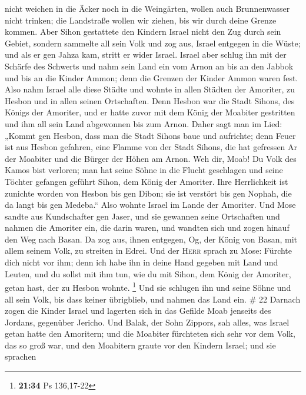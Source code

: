 nicht weichen in die Äcker noch in die Weingärten, wollen auch
Brunnenwasser nicht trinken; die Landstraße wollen wir ziehen, bis wir
durch deine Grenze kommen.  Aber Sihon gestattete den
Kindern Israel nicht den Zug durch sein Gebiet, sondern sammelte all
sein Volk und zog aus, Israel entgegen in die Wüste; und als er gen
Jahza kam, stritt er wider Israel.  Israel aber schlug
ihn mit der Schärfe des Schwerts und nahm sein Land ein vom Arnon an bis
an den Jabbok und bis an die Kinder Ammon; denn die Grenzen der Kinder
Ammon waren fest.  Also nahm Israel alle diese Städte und
wohnte in allen Städten der Amoriter, zu Hesbon und in allen seinen
Ortschaften.  Denn Hesbon war die Stadt Sihons, des
Königs der Amoriter, und er hatte zuvor mit dem König der Moabiter
gestritten und ihm all sein Land abgewonnen bis zum Arnon.
 Daher sagt man im Lied: „Kommt gen Hesbon, dass man die
Stadt Sihons baue und aufrichte;  denn Feuer ist aus
Hesbon gefahren, eine Flamme von der Stadt Sihons, die hat gefressen Ar
der Moabiter und die Bürger der Höhen am Arnon.  Weh dir,
Moab! Du Volk des Kamos bist verloren; man hat seine Söhne in die Flucht
geschlagen und seine Töchter gefangen geführt Sihon, dem König der
Amoriter.  Ihre Herrlichkeit ist zunichte worden von
Hesbon bis gen Dibon; sie ist verstört bis gen Nophah, die da langt bis
gen Medeba.``  Also wohnte Israel im Lande der Amoriter.
 Und Mose sandte aus Kundschafter gen Jaser, und sie
gewannen seine Ortschaften und nahmen die Amoriter ein, die darin waren,
 und wandten sich und zogen hinauf den Weg nach Basan. Da
zog aus, ihnen entgegen, Og, der König von Basan, mit allem seinem Volk,
zu streiten in Edrei.  Und der \textsc{Herr} sprach zu
Mose: Fürchte dich nicht vor ihm; denn ich habe ihn in deine Hand
gegeben mit Land und Leuten, und du sollst mit ihm tun, wie du mit
Sihon, dem König der Amoriter, getan hast, der zu Hesbon wohnte.
\footnote{\textbf{21:34} Ps 136,17-22}  Und sie schlugen
ihn und seine Söhne und all sein Volk, bis dass keiner übrigblieb, und
nahmen das Land ein. \# 22  Darnach zogen die Kinder
Israel und lagerten sich in das Gefilde Moab jenseits des Jordans,
gegenüber Jericho.  Und Balak, der Sohn Zippors, sah
alles, was Israel getan hatte den Amoritern;  und die
Moabiter fürchteten sich sehr vor dem Volk, das so groß war, und den
Moabitern graute vor den Kindern Israel;  und sie sprachen
